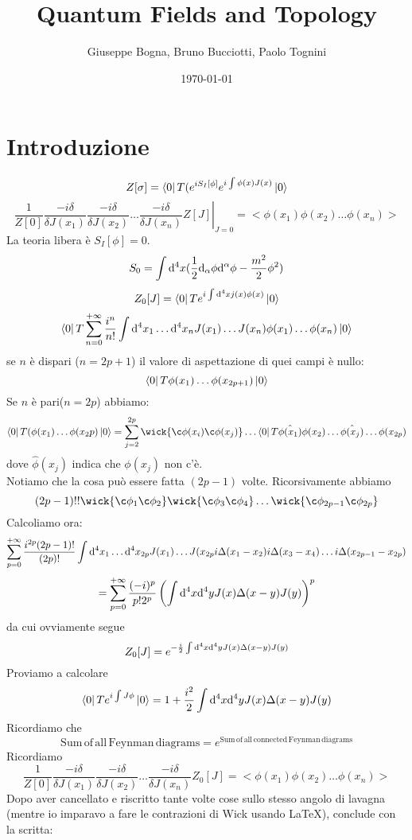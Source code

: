 \documentclass[a4paper, 11pt]{article}
\date{\today}
\author{Giuseppe Bogna, Bruno Bucciotti, Paolo Tognini}
\title{Quantum Fields and Topology}
\begin{document}
	\maketitle
	\tableofcontents
	\clearpage
	
	
	\section{Introduzione}
	
	\[Z[\sigma] = \left\langle 0\right|T(e^{iS_I[\phi]}e^{i\int{\phi(x)J(x)}}\left| 0\right\rangle\]
	\[\left. \frac{1}{Z[0]}{\frac{-i\delta}{\delta J(x_1)}\frac{-i\delta}{\delta J(x_2)}\dots \frac{-i\delta}{\delta J(x_n)}}Z[J] \right|_{J=0} = <\phi(x_1)\phi(x_2)\dots \phi(x_n)>\]
	La teoria libera è $S_I[\phi]=0$.\\
	\[S_0 = \int \mathrm{d}^4 x (\frac{1}{2}\mathrm{d}_\alpha \phi \mathrm{d}^\alpha \phi - \frac{m^2}{2}\phi^2)\]
	\[Z_0[J]=\left\langle 0\right|Te^{i\int \mathrm{d}^4 x j(x)\phi(x)}\left| 0\right\rangle\]
	\[\left\langle 0\right|T\sum_{n=0}^{+\infty} \frac{i^n}{n!}\int \mathrm{d}^4x_1 \dots \mathrm{d}^4 x_n J(x_1)\dots J(x_n) \phi(x_1)\dots \phi(x_n)\left| 0\right\rangle\]
	se $n$ è dispari ($n=2p+1$) il valore di aspettazione di quei campi è nullo:
	\[\left\langle 0\right|T\phi(x_1)\dots \phi(x_{2p+1})\left| 0\right\rangle\]
	Se $n$ è pari($n=2p$) abbiamo:
	\[\bra{0}T(\phi(x_1)\dots\phi(x_2p)\ket{0} = \sum_{j=2}^{2p}\wick{\c\phi(x_i) \c\phi(x_j)} \dots \bra{0}T\hat {\phi(x_1)} \phi(x_2) \dots \hat{\phi(x_j)}\dots \phi(x_{2p})\]
	dove $\hat \phi(x_j)$ indica che $\phi(x_j)$ non c'è.\\
	Notiamo che la cosa può essere fatta $(2p-1)$ volte. Ricorsivamente abbiamo
	\[(2p-1)!! \wick{\c \phi_1 \c \phi_2} \wick{\c \phi_3 \c \phi_4} \dots \wick{\c \phi_{2p-1} \c \phi_{2p}}\]
	Calcoliamo ora:
	\[\sum_{p=0}^{+\infty} \frac{i^{2p}(2p-1)!}{(2p)!} \int \mathrm{d}^4x_1 \dots \mathrm{d}^4 x_{2p} J(x_1)\dots J(x_{2p} i\Delta(x_1-x_2) i\Delta(x_3-x_4) \dots i\Delta(x_{2p-1}-x_{2p})\]
	\[= \sum_{p=0}^{+\infty} \frac{(-i)^p}{p!2^p} \left( \int \mathrm{d}^4 x \mathrm{d}^4 y J(x)\Delta(x-y)J(y)\right)^p\]
	da cui ovviamente segue
	\[Z_0[J] = e^{-\frac{i}{2}\int \mathrm{d}^4 x \mathrm{d}^4 y J(x)\Delta(x-y)J(y)} \]
	Proviamo a calcolare
	\[\left\langle 0\right|Te^{i\int J\phi}\left| 0\right\rangle = 1 + \frac{i^2}{2} \int \mathrm{d}^4 x \mathrm{d}^4 y J(x)\Delta(x-y)J(y)\]
	Ricordiamo che
	\[\mathrm{Sum\,of\,all\,Feynman\,diagrams}=e^\mathrm{Sum\,of\,all\,connected\,Feynman\,diagrams}\]
	Ricordiamo
	\[ \frac{1}{Z[0]}\frac{-i\delta}{\delta J(x_1)}\frac{-i\delta}{\delta J(x_2)}\dots \frac{-i\delta}{\delta J(x_n)} Z_0[J] = <\phi(x_1)\phi(x_2)\dots \phi(x_n)> \]
	Dopo aver cancellato e riscritto tante volte cose sullo stesso angolo di lavagna (mentre io imparavo a fare le contrazioni di Wick usando LaTeX), conclude con la scritta:
\end{document}
